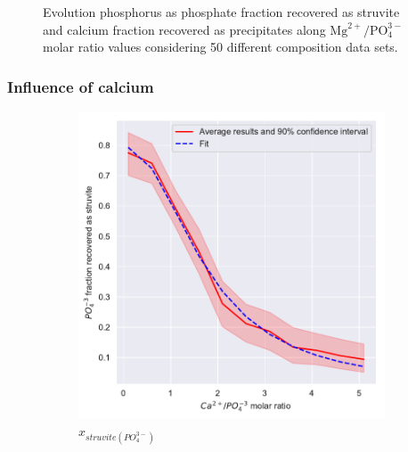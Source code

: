\begin{refsection}[referencesCh3]
\begin{figure}[h]
	\caption{Evolution phosphorus as phosphate fraction recovered as struvite and calcium fraction recovered as precipitates along $\text{Mg}^{2+}/\text{PO}_{4}^{3-}$ molar ratio values considering 50 different composition data sets.}
	\label{fig:estimation_Mg_ca}
\end{figure}

\clearpage
\subsubsection{Influence of calcium}
\begin{figure}[h] 
	\centering
	\begin{subfigure}[t]{0.25\textheight}
		\includegraphics[width=\textwidth]{gfx/AppendixB/plotStrYield_Ca}
		\caption{$x_{struvite \left(PO_{4}^{3-}\right)}$}
		\label{fig:estimation_Ca_value}
	\end{subfigure}
	\begin{subfigure}[t]{0.25\textheight}

\end{subfigure}
\end{figure}
\end{refsection}
